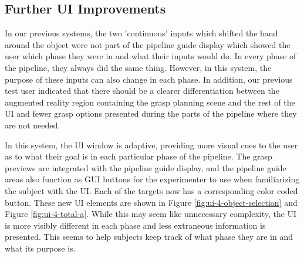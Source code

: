 \subsection{Further UI Improvements}
In our previous systems, the two 'continuous' inputs which shifted the hand around the object were not part of the pipeline guide display which showed the user which phase they were in and what their inputs would do. In every phase of the pipeline, they always did the same thing. However, in this system, the purpose of these inputs can also change in each phase. In addition, our previous test user indicated that there should be a clearer differentiation between the augmented reality region containing the grasp planning scene and the rest of the UI and fewer grasp options presented during the parts of the pipeline where they are not needed.

In this system, the UI window is adaptive, providing more visual cues to the user as to what their goal is in each particular phase of the pipeline. The grasp previews are integrated with the pipeline guide display, and the pipeline guide areas also function as GUI buttons for the experimenter to use when familiarizing the subject with the UI. Each of the targets now has a corresponding color coded button. These new UI elements are shown in Figure \ref{fig:ui-4-object-selection} and Figure \ref{fig:ui-4-total-a}. While this may seem like unnecessary complexity, the UI is more visibly different in each phase and less extraneous information is presented. This seems to help subjects keep track of what phase they are in and what its purpose is. 

